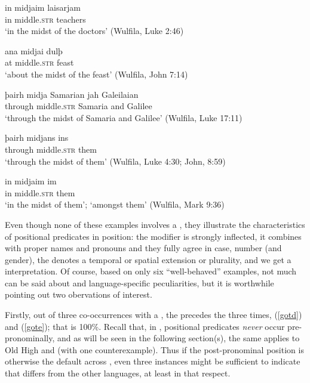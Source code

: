 \documentclass[output=paper,colorlinks,citecolor=brown]{langscibook}
\begin{document}
\begin{exe}
   \ex \label{got}   
     \begin{xlist}
       \ex \label{gota} \gll  in midjaim  laisarjam  \\   
        in middle.\textsc{str} teachers \\  
       \glt  `in the midst of the doctors' (Wulfila, Luke 2:46)

       \ex \label{gotb} \gll ana midjai dulþ  \\   
         at middle.\textsc{str} feast  \\ 
         \glt `about the midst of the feast' (Wulfila, John 7:14)

       \ex \label{gotc} \gll þairh midja {Samarian jah Galeilaian} \\ 
         through   middle.\textsc{str}  {Samaria and Galilee} \\ 
         \glt `through the midst of Samaria and Galilee' (Wulfila, Luke 17:11)

       \ex \label{gotd} \gll þairh midjans ins  \\  
          through middle.\textsc{str} them  \\ 
          \glt `through the midst of them' (Wulfila, Luke 4:30; John, 8:59)

       \ex \label{gote} \gll in midjaim im \\ 
         in middle.\textsc{str} them \\
          \glt `in the midst of them'; `amongst them' (Wulfila, Mark 9:36)

    \end{xlist}
\end{exe} 

Even though none of these examples involves a , they illustrate the characteristics of positional predicates in  position: the modifier is strongly inflected, it combines with proper names and pronouns  and they fully agree in case, number (and gender),  the  denotes a temporal or spatial extension or plurality, and we get a  interpretation. Of course, based on only six ``well-behaved'' examples, not much can be said about  and language-specific peculiarities, but it is worthwhile pointing out  two obervations of interest. 

Firstly, out of three co-occurrences with a , the  precedes the  three times,  (\ref{gotd}) and (\ref{gote}); that is 100\%.   
Recall that, in , positional predicates \textit{never} occur pre-pronominally, and as will be seen in the following section(s), the same applies to Old High  and  (with one counterexample).  Thus if the post-pronominal position is otherwise the default across , even three instances might be sufficient to indicate that  differs from the other  languages, at least in that respect. 
\end{document}
